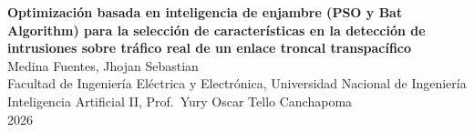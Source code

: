 \documentclass[11pt,a4paper]{article}
\begin{document}
\begin{center}
{\large\bfseries Optimización basada en inteligencia de enjambre (PSO y Bat Algorithm) para la selección de características en la detección de intrusiones sobre tráfico real de un enlace troncal transpacífico}\\[10pt]
Medina Fuentes, Jhojan Sebastian\\
Facultad de Ingeniería Eléctrica y Electrónica, Universidad Nacional de Ingeniería\\
Inteligencia Artificial II, Prof.\ Yury Oscar Tello Canchapoma\\
2026
\end{center}
\end{document}
